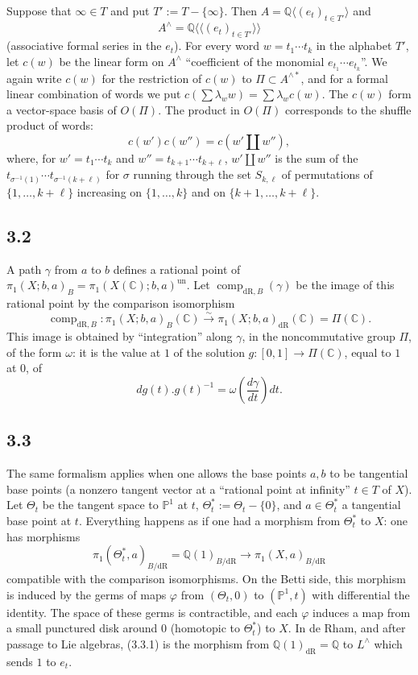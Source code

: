 \documentclass[11pt]{article}
\newcommand{\Q}{\mathbb Q}
\newcommand{\C}{\mathbb C}
\newcommand{\PP}{\mathbb P}
\newcommand{\comp}{\operatorname{comp}}
\newcommand{\dR}{\mathrm{dR}}
\newcommand{\shuffle}{\mathbin{\amalg}}
\begin{document}
Suppose that $\infty\in T$ and put $T':=T-\{\infty\}$.
Then $A=\Q\langle(e_t)_{t\in T'}\rangle$ and
\[
 A^\wedge=\Q\langle\!\langle(e_t)_{t\in T'}\rangle\!\rangle
\]
(associative formal series in the $e_t$).
For every word $w=t_1\cdots t_k$ in the alphabet $T'$, let $c(w)$ be the linear form on $A^\wedge$ ``coefficient of the monomial $e_{t_1}\cdots e_{t_k}$''.
We again write $c(w)$ for the restriction of $c(w)$ to $\Pi\subset A^{\wedge *}$, and for a formal linear combination of words we put $c(\sum\lambda_w w)=\sum\lambda_w c(w)$.
The $c(w)$ form a vector-space basis of $O(\Pi)$.
The product in $O(\Pi)$ corresponds to the shuffle product of words:
\begin{equation}
 c(w')c(w'')=c(w'\shuffle w''),
\tag{3.1.5}
\end{equation}
where, for $w'=t_1\cdots t_k$ and $w''=t_{k+1}\cdots t_{k+\ell}$, $w'\shuffle w''$ is the sum of the $t_{\sigma^{-1}(1)}\cdots t_{\sigma^{-1}(k+\ell)}$ for $\sigma$ running through the set $S_{k,\ell}$ of permutations of $\{1,\ldots,k+\ell\}$ increasing on $\{1,\ldots,k\}$ and on $\{k+1,\ldots,k+\ell\}$.

\subsection*{3.2}
A path $\gamma$ from $a$ to $b$ defines a rational point of $\pi_1(X;b,a)_B=\pi_1(X(\C);b,a)^{\mathrm{un}}$.
Let $\comp_{\dR,B}(\gamma)$ be the image of this rational point by the comparison isomorphism
\[
 \comp_{\dR,B}:\pi_1(X;b,a)_B(\C)\xrightarrow{\sim}\pi_1(X;b,a)_{\dR}(\C)=\Pi(\C).
\]
This image is obtained by ``integration'' along $\gamma$, in the noncommutative group $\Pi$, of the form $\omega$: it is the value at $1$ of the solution $g:[0,1]\to\Pi(\C)$, equal to $1$ at $0$, of
\begin{equation}
 dg(t).g(t)^{-1}=\omega\left(\frac{d\gamma}{dt}\right)dt.
\tag{3.2.1}
\end{equation}

\subsection*{3.3}
The same formalism applies when one allows the base points $a,b$ to be tangential base points (a nonzero tangent vector at a ``rational point at infinity'' $t\in T$ of $X$).
Let $\Theta_t$ be the tangent space to $\PP^1$ at $t$, $\Theta_t^*:=\Theta_t-\{0\}$, and $a\in\Theta_t^*$ a tangential base point at $t$.
Everything happens as if one had a morphism from $\Theta_t^*$ to $X$: one has morphisms
\begin{equation}
 \pi_1(\Theta_t^*,a)_{B/\dR}=\Q(1)_{B/\dR}\longrightarrow\pi_1(X,a)_{B/\dR}
\tag{3.3.1}
\end{equation}
compatible with the comparison isomorphisms.
On the Betti side, this morphism is induced by the germs of maps $\varphi$ from $(\Theta_t,0)$ to $(\PP^1,t)$ with differential the identity.
The space of these germs is contractible, and each $\varphi$ induces a map from a small punctured disk around $0$ (homotopic to $\Theta_t^*$) to $X$.
In de Rham, and after passage to Lie algebras, (3.3.1) is the morphism from $\Q(1)_{\dR}=\Q$ to $L^\wedge$ which sends $1$ to $e_t$.
\end{document}

